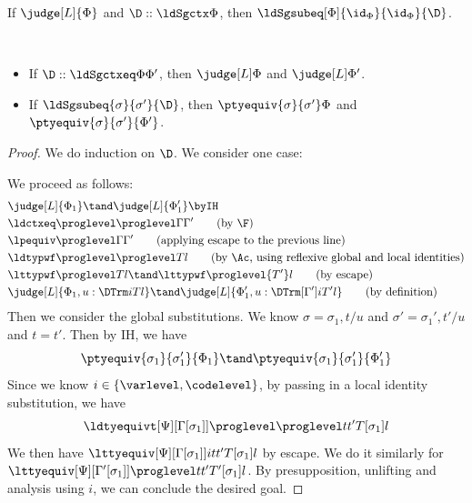 \begin{corollary}
  If $\judge[L]{\Phi}$ and $\D :: \ldSgctx \Phi$, then
  $\ldSgsubeq[\Phi]{\id_{\Phi}}{\id_{\Phi}}{\D}$. 
\end{corollary}

\begin{lemma}[Escape] $ $
  \begin{itemize}
  \item If $\D :: \ldSgctxeq \Phi{\Phi'}$, then $\judge[L]\Phi$ and $\judge[L]\Phi'$.
  \item If $\ldSgsubeq{\sigma}{\sigma'}{\D}$, then $\ptyequiv{\sigma}{\sigma'}\Phi$
    and $\ptyequiv{\sigma}{\sigma'}{\Phi'}$. 
  \end{itemize}
\end{lemma}
\begin{proof}
  We do induction on $\D$. We consider one case:
  We proceed as follows:
  \begin{align*}
    & \judge[L]{\Phi_1} \tand \judge[L]{\Phi_1'}
      \byIH \\
    & \ldctxeq \proglevel \proglevel \Gamma{\Gamma'}
      \tag{by $\F$} \\
    & \lpequiv \proglevel \Gamma{\Gamma'}
      \tag{applying escape to the previous line} \\
    & \ldtypwf \proglevel \proglevel T l
      \tag{by $\Ac$, using reflexive global and local identities} \\
    & \lttypwf \proglevel T l \tand \lttypwf \proglevel{T'} l
      \tag{by escape} \\
    & \judge[L]{\Phi_1, u : \DTrm i T l} \tand \judge[L]{\Phi_1', u : \DTrm[\Gamma'] i{T'} l}
      \tag{by definition}
  \end{align*}
  Then we consider the global substitutions. %
  We know $\sigma = \sigma_1, t/u$ and $\sigma' = \sigma_1', t'/u$ and $t = t'$. %
  Then by IH, we have
  \[
    \ptyequiv{\sigma_1}{\sigma_1'}{\Phi_1} \tand \ptyequiv{\sigma_1}{\sigma_1'}{\Phi_1'}
  \]
  Since we know $i \in \{\varlevel,\codelevel\}$, by passing in a local identity substitution, we have
  \[
    \ldtyequivt[\Psi][\Gamma[\sigma_1]] \proglevel \proglevel t{t'}{T[\sigma_1]} l
  \]
  We then have $\lttyequiv[\Psi][\Gamma[\sigma_1]]i t{t'}{T[\sigma_1]} l$ by escape. %
  We do it similarly for
  $\lttyequiv[\Psi][\Gamma'[\sigma_1]] \proglevel t{t'}{T'[\sigma_1]} l$.  By presupposition,
  unlifting and analysis using $i$, we can conclude the desired goal.
\end{proof}

